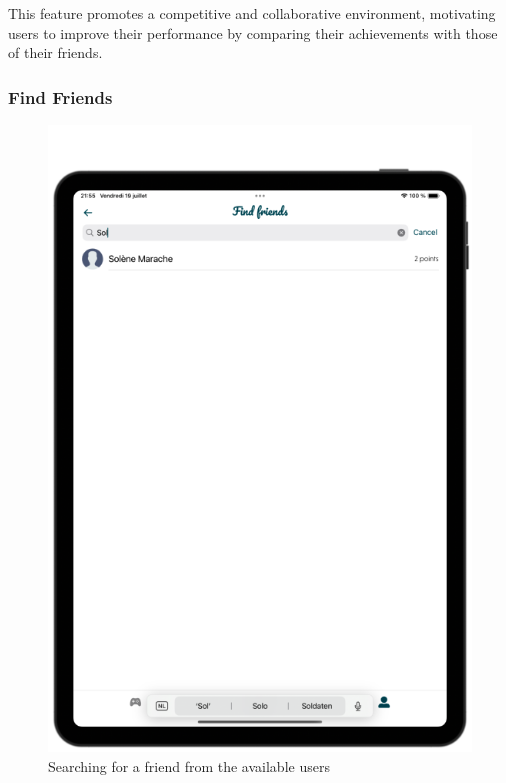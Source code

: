 This feature promotes a competitive and collaborative environment, motivating users to improve their performance by comparing their achievements with those of their friends.

\subsubsection{Find Friends}

\begin{figure}[H]
    \centering
    \begin{minipage}[b]{0.43\linewidth}
        \centering
        \includegraphics[width=\linewidth]{TabletUI/Searching for a friend from the available users.png}
        \caption{Searching for a friend from the available users}
    \end{minipage}

\end{figure}
